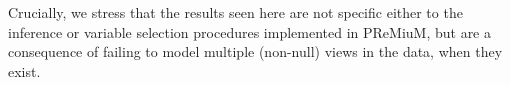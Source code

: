 \documentclass[12pt]{article}
\begin{document}
Crucially, we stress that the results seen here are not specific either to the inference or variable selection procedures implemented in PReMiuM, but are a consequence of failing to model multiple (non-null) views in the data, when they exist.    

\end{document}
